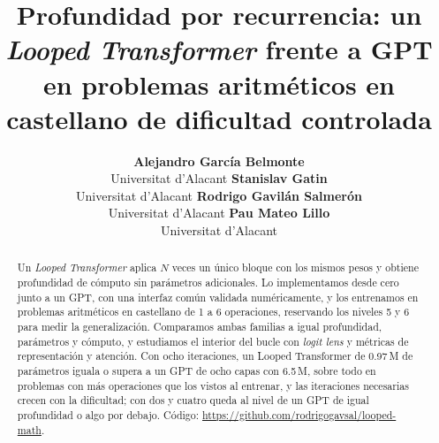 \documentclass[11pt]{article}
\title{Profundidad por recurrencia: un \emph{Looped Transformer} frente a GPT\\
en problemas aritméticos en castellano de dificultad controlada}
\author{\textbf{Alejandro García Belmonte}\\Universitat d'Alacant
\And \textbf{Stanislav Gatin}\\Universitat d'Alacant
\AND \textbf{Rodrigo Gavilán Salmerón}\\Universitat d'Alacant
\And \textbf{Pau Mateo Lillo}\\Universitat d'Alacant}
\begin{document}
\maketitle

\begin{abstract}
Un \emph{Looped Transformer} aplica $N$ veces un único bloque con los mismos
pesos y obtiene profundidad de cómputo sin parámetros adicionales. Lo
implementamos desde cero junto a un GPT, con una interfaz común validada
numéricamente, y los entrenamos en problemas aritméticos en castellano de 1 a 6
operaciones, reservando los niveles 5 y 6 para medir la generalización.
Comparamos ambas familias a igual profundidad, parámetros y cómputo, y
estudiamos el interior del bucle con \emph{logit lens} y métricas de
representación y atención. Con ocho iteraciones, un Looped Transformer de
0.97\,M de parámetros iguala o supera a un GPT de ocho capas con 6.5\,M, sobre
todo en problemas con más operaciones que los vistos al entrenar, y las
iteraciones necesarias crecen con la dificultad; con dos y cuatro queda al nivel
de un GPT de igual profundidad o algo por debajo. Código:
\url{https://github.com/rodrigogavsal/looped-math}.
\end{abstract}









\end{document}
